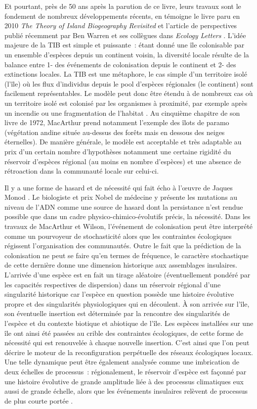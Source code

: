Et pourtant, près de 50 ans après la parution de ce livre, leurs travaux
sont le fondement de nombreux développements récents, en témoigne le
livre paru en 2010 \emph{The Theory of Island Biogeography Revisited}
\citep{Losos2010} et l'article de perspectives publié récemment par Ben
Warren et ses collègues dans \emph{Ecology Letters} \citep{Warren2015}.
L'idée majeure de la TIB est simple et puissante~: étant donné une île
colonisable par un ensemble d'espèces depuis un continent voisin, la
diversité locale résulte de la balance entre 1- des événements de
colonisation depuis le continent et 2- des extinctions locales. La TIB
est une métaphore, le cas simple d'un territoire isolé (l'île) où les
flux d'individus depuis le pool d'espèces régionales (le continent) sont
facilement représentables. Le modèle peut donc être étendu à de nombreux
cas où un territoire isolé est colonisé par les organismes à proximité,
par exemple après un incendie ou une fragmentation de l'habitat
\citep{Cook2002}. Au cinquième chapitre de son livre de 1972, MacArthur
prend notamment l'exemple des îlots de paramo (végétation andine située
au-dessus des forêts mais en dessous des neiges éternelles). De manière
générale, le modèle est acceptable et très adaptable au prix d'un
certain nombre d'hypothèses notamment une certaine rigidité du réservoir
d'espèces régional (au moins en nombre d'espèces) et une absence de
rétroaction dans la communauté locale sur celui-ci.

Il y a une forme de hasard et de nécessité qui fait écho à l'œuvre de
Jaques Monod \citep{monod1970hasard}. Le biologiste et prix Nobel de
médecine y présente les mutations au niveau de l'ADN comme une source de
hasard dont la persistance n'est rendue possible que dans un cadre
physico-chimico-évolutifs précis, la nécessité. Dans les travaux de
MacArthur et Wilson, l'événement de colonisation peut être interprété
comme un pourvoyeur de stochasticité alors que les contraintes
écologiques régissent l'organisation des communautés. Outre le fait que
la prédiction de la colonisation ne peut se faire qu'en termes de
fréquence, le caractère stochastique de cette dernière donne une
dimension historique aux assemblages insulaires. L'arrivée d'une espèce
est en fait un tirage aléatoire (éventuellement pondéré par les
capacités respectives de dispersion) dans un réservoir régional d'une
singularité historique car l'espèce en question possède une histoire
évolutive propre et des singularités physiologiques qui en découlent. À
son arrivée sur l'île, son éventuelle insertion est déterminée par la
rencontre des singularités de l'espèce et du contexte biotique et
abiotique de l'île. Les espèces installées sur une île ont ainsi été
passées au crible des contraintes écologiques, de cette forme de
nécessité qui est renouvelée à chaque nouvelle insertion. C'est ainsi
que l'on peut décrire le moteur de la reconfiguration perpétuelle des
réseaux écologiques locaux. Une telle dynamique peut être également
analysée comme une imbrication de deux échelles de processus~:
régionalement, le réservoir d'espèce est façonné par une histoire
évolutive de grande amplitude liée à des processus climatiques eux aussi
de grande échelle, alors que les événements insulaires relèvent de
processus de plus courte portée \citep{Ricklefs1987}.

